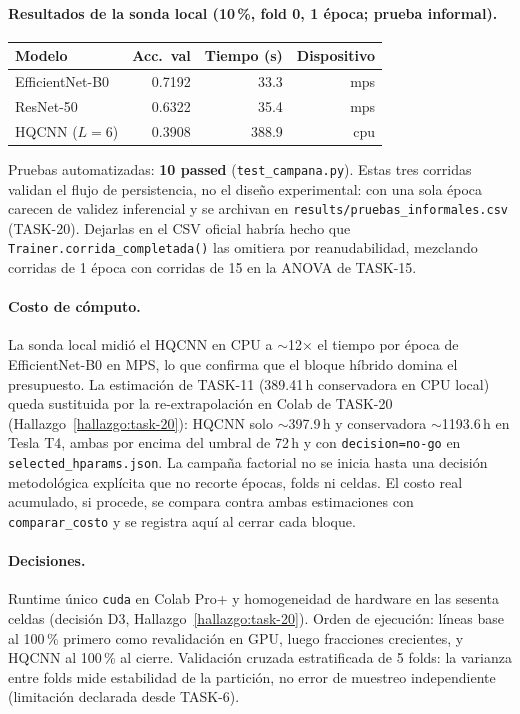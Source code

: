 \paragraph{Resultados de la sonda local (10\,\%, fold 0, 1 época; prueba informal).}
\begin{center}
\small
\begin{tabular}{lrrr}\hline
\textbf{Modelo} & \textbf{Acc.\ val} & \textbf{Tiempo (s)} & \textbf{Dispositivo} \\\hline
EfficientNet-B0 & 0.7192 & 33.3 & mps \\
ResNet-50 & 0.6322 & 35.4 & mps \\
HQCNN ($L=6$) & 0.3908 & 388.9 & cpu \\\hline
\end{tabular}
\end{center}

Pruebas automatizadas: \textbf{10 passed} (\texttt{test\_campana.py}).
Estas tres corridas validan el flujo de persistencia, no el diseño experimental: con una sola
época carecen de validez inferencial y se archivan en
\texttt{results/pruebas\_informales.csv} (TASK-20). Dejarlas en el CSV oficial habría hecho que
\texttt{Trainer.corrida\_completada()} las omitiera por reanudabilidad, mezclando corridas de 1
época con corridas de 15 en la ANOVA de TASK-15.

\paragraph{Costo de cómputo.}
La sonda local midió el HQCNN en CPU a $\sim$12$\times$ el tiempo por época de EfficientNet-B0
en MPS, lo que confirma que el bloque híbrido domina el presupuesto. La estimación de TASK-11
(389.41\,h conservadora en CPU local) queda sustituida por la re-extrapolación en Colab de
TASK-20 (Hallazgo~\ref{hallazgo:task-20}): HQCNN solo $\sim$397.9\,h y conservadora
$\sim$1193.6\,h en Tesla T4, ambas por encima del umbral de 72\,h y con
\texttt{decision=no-go} en \texttt{selected\_hparams.json}. La campaña factorial no se inicia
hasta una decisión metodológica explícita que no recorte épocas, folds ni celdas. El costo real
acumulado, si procede, se compara contra ambas estimaciones con \texttt{comparar\_costo} y se
registra aquí al cerrar cada bloque.

\paragraph{Decisiones.}
Runtime único \texttt{cuda} en Colab Pro+ y homogeneidad de hardware en las sesenta celdas
(decisión D3, Hallazgo~\ref{hallazgo:task-20}).
Orden de ejecución: líneas base al 100\,\% primero como revalidación en GPU, luego fracciones
crecientes, y HQCNN al 100\,\% al cierre.
Validación cruzada estratificada de 5 folds: la varianza entre folds mide estabilidad de la
partición, no error de muestreo independiente~\cite{li2021cvstability} (limitación declarada
desde TASK-6).

